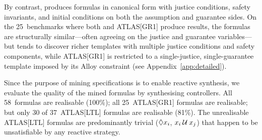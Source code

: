 By contrast, \toolname produces formulas in canonical \GRone form
with justice conditions, safety invariants, and initial conditions
on both the assumption and guarantee sides.
On the 25~benchmarks where both \toolname and ATLAS[GR1] produce
results, the formulas are structurally similar---often agreeing
on the justice and guarantee variables---but \toolname tends to
discover richer templates with multiple justice conditions and
safety components, while ATLAS[GR1] is restricted to a
single-justice, single-guarantee template imposed by its Alloy
constraint (see Appendix~\ref{app:detailed}).

Since the purpose of mining \GRone specifications is to enable
reactive synthesis, we evaluate the quality of the mined formulas
by synthesising controllers.
All 58~\toolname formulas are realisable (100\%);
all 25~ATLAS[GR1] formulas are realisable;
but only 30 of 37~ATLAS[LTL] formulas are realisable (81\%).
The unrealisable ATLAS[LTL] formulas are predominantly trivial
($\Diamond x_i$, $x_i \mathbin{\mathcal{U}} x_j$) that happen to be
unsatisfiable by any reactive strategy.
